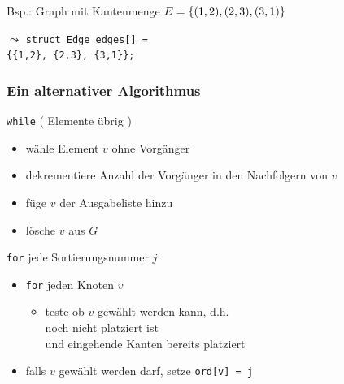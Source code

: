 \documentclass{beamer}
\begin{document}
\begin{frame}[fragile]
\begin{minipage}[t]{\dimexpr0.5\linewidth-\fboxrule-\fboxsep}
		Bsp.: Graph mit Kantenmenge $E = \left\{ (1,2), (2,3), (3,1) \right\}$
		\begin{center}
		\end{center}

		$\leadsto$ \lstinline|struct Edge edges[] =| \\ \phantom{~} \hfill \lstinline|{{1,2}, {2,3}, {3,1}};| 
	\end{minipage}
\end{frame}

\begin{frame} \frametitle{Ein alternativer Algorithmus}
	\small
	\begin{minipage}[t]{\dimexpr0.5\linewidth-\fboxrule-\fboxsep}
		\texttt{while} ( Elemente übrig ) 
		\begin{itemize}
			\item wähle Element $v$ ohne Vorgänger
			\item dekrementiere Anzahl der Vorgänger in den Nachfolgern von $v$
			\item füge $v$ der Ausgabeliste hinzu
			\item lösche $v$ aus $G$
		\end{itemize}
	\end{minipage}
	\begin{minipage}[t]{\dimexpr0.5\linewidth-\fboxrule-\fboxsep}
		\texttt{for} jede Sortierungsnummer $j$
		\begin{itemize}
			\item \texttt{for} jeden Knoten	$v$
			\begin{itemize}
				\item teste ob $v$ gewählt werden kann, d.h. \\ noch nicht platziert ist \\ und eingehende Kanten bereits platziert
			\end{itemize}
			\item falls $v$ gewählt werden darf, setze \texttt{ord[v] = j}
		\end{itemize}
	\end{minipage}
\end{frame}
\end{document}
